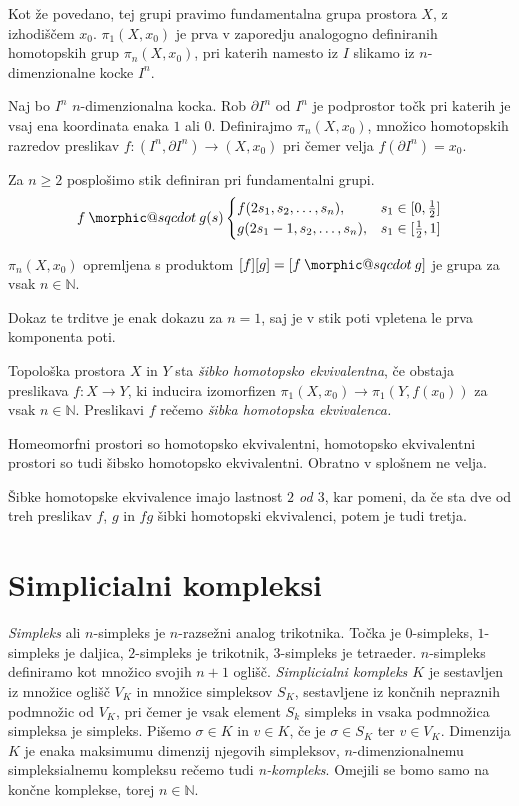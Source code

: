\documentclass[mat1]{fmfdelo}
\makeatletter
\DeclareRobustCommand{\sqcdot}{\mathbin{\mathpalette\morphic@sqcdot\relax}}
\newcommand{\morphic@sqcdot}[2]{%
\sbox\z@{$\m@th#1\centerdot$}%
\ht\z@=.33333\ht\z@
\vcenter{\box\z@}%
}
\makeatother
\begin{document}
Kot že povedano, tej grupi pravimo fundamentalna grupa prostora $X$, z izhodiščem $x_0$. $\pi_1(X,x_0)$ je prva v zaporedju analogogno definiranih homotopskih grup $\pi_n(X,x_0)$, pri katerih namesto iz $I$ slikamo iz $n$-dimenzionalne kocke $I^n$.


Naj bo $I^n$ $n$-dimenzionalna kocka. Rob $\partial I^n \text{ od } I^n$ je podprostor točk pri katerih je vsaj ena koordinata enaka $1$ ali $0$. Definirajmo $\pi_n(X,x_0)$, množico homotopskih razredov preslikav $f:(I^n,\partial I^n) \rightarrow (X,x_0)$ pri čemer velja $f(\partial I^n) = x_0$.


Za $n\ge 2$ posplošimo stik definiran pri fundamentalni grupi.
$$ f\sqcdot g(s) \begin{cases}
    f(2s_1,s_2,\ldots,s_n), & s_1\in [0,\frac{1}{2}] \\
    g(2s_1-1,s_2,\ldots,s_n), & s_1 \in [\frac{1}{2},1]
\end{cases}
$$

\begin{izrek}
    $\pi_n(X,x_0)$ opremljena s produktom $[f][g] = [f\sqcdot g]$ je grupa za vsak $n \in \mathds{N}$.
\end{izrek}

Dokaz te trditve je enak dokazu za $n=1$, saj je v stik poti vpletena le prva komponenta poti.

\begin{definicija}
    Topološka prostora $X$ in $Y$ sta \textit{šibko homotopsko ekvivalentna}, če obstaja preslikava $f:X\rightarrow Y$, ki inducira izomorfizen $\pi_1(X,x_0)\rightarrow \pi_1(Y,f(x_0))$ za vsak $n \in \mathbb{N}$. Preslikavi $f$ rečemo \textit{šibka homotopska ekvivalenca.}
\end{definicija}



Homeomorfni prostori so homotopsko ekvivalentni, homotopsko ekvivalentni prostori so tudi šibsko homotopsko ekvivalentni. Obratno v splošnem ne velja.

Šibke homotopske ekvivalence imajo lastnost \textit{$2$ od $3$}, kar pomeni, da če sta dve od treh preslikav $f$, $g$ in $fg$ šibki homotopski ekvivalenci, potem je tudi tretja.
\section{Simplicialni kompleksi}\label{sec:simpleks}

\textit{Simpleks} ali $n$-simpleks je $n$-razsežni analog trikotnika. Točka je $0$-simpleks, $1$-simpleks je daljica, $2$-simpleks je trikotnik,
$3$-simpleks je tetraeder. $n$-simpleks definiramo kot množico svojih $n+1$ oglišč. \textit{Simplicialni kompleks $K$} je sestavljen iz množice oglišč $V_K$ in množice simpleksov $S_K$, sestavljene iz končnih nepraznih podmnožic od $V_K$, pri čemer je vsak element $S_k$ simpleks in vsaka podmnožica simpleksa je simpleks. Pišemo $\sigma \in K$ in $v \in K$, če je $\sigma \in S_K$ ter $v \in V_K$. Dimenzija $K$ je enaka maksimumu dimenzij njegovih simpleksov, $n$-dimenzionalnemu simpleksialnemu kompleksu rečemo tudi \textit{n-kompleks}. Omejili se bomo samo na končne komplekse, torej $n \in \mathbb{N}$.
\end{document}
